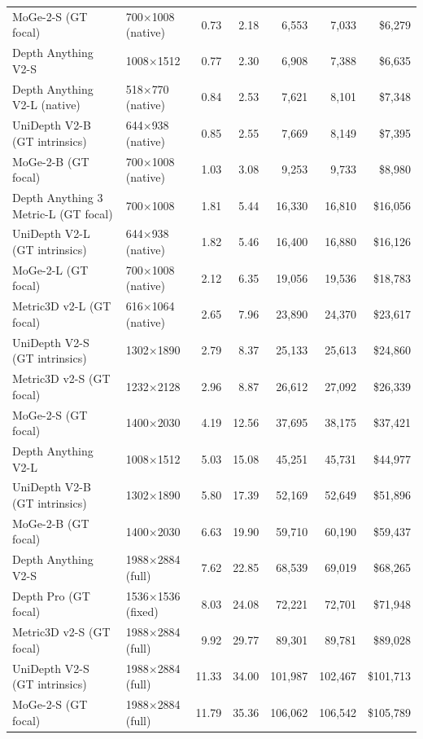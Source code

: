 \begin{tabular}{llrrrrr}
MoGe-2-S (GT focal) & 700$\times$1008 (native) & 0.73 & 2.18 & 6,553 & 7,033 & \$6,279 \\
Depth Anything V2-S & 1008$\times$1512 & 0.77 & 2.30 & 6,908 & 7,388 & \$6,635 \\
Depth Anything V2-L (native) & 518$\times$770 (native) & 0.84 & 2.53 & 7,621 & 8,101 & \$7,348 \\
UniDepth V2-B (GT intrinsics) & 644$\times$938 (native) & 0.85 & 2.55 & 7,669 & 8,149 & \$7,395 \\
MoGe-2-B (GT focal) & 700$\times$1008 (native) & 1.03 & 3.08 & 9,253 & 9,733 & \$8,980 \\
Depth Anything 3 Metric-L (GT focal) & 700$\times$1008 & 1.81 & 5.44 & 16,330 & 16,810 & \$16,056 \\
UniDepth V2-L (GT intrinsics) & 644$\times$938 (native) & 1.82 & 5.46 & 16,400 & 16,880 & \$16,126 \\
MoGe-2-L (GT focal) & 700$\times$1008 (native) & 2.12 & 6.35 & 19,056 & 19,536 & \$18,783 \\
Metric3D v2-L (GT focal) & 616$\times$1064 (native) & 2.65 & 7.96 & 23,890 & 24,370 & \$23,617 \\
UniDepth V2-S (GT intrinsics) & 1302$\times$1890 & 2.79 & 8.37 & 25,133 & 25,613 & \$24,860 \\
Metric3D v2-S (GT focal) & 1232$\times$2128 & 2.96 & 8.87 & 26,612 & 27,092 & \$26,339 \\
MoGe-2-S (GT focal) & 1400$\times$2030 & 4.19 & 12.56 & 37,695 & 38,175 & \$37,421 \\
Depth Anything V2-L & 1008$\times$1512 & 5.03 & 15.08 & 45,251 & 45,731 & \$44,977 \\
UniDepth V2-B (GT intrinsics) & 1302$\times$1890 & 5.80 & 17.39 & 52,169 & 52,649 & \$51,896 \\
MoGe-2-B (GT focal) & 1400$\times$2030 & 6.63 & 19.90 & 59,710 & 60,190 & \$59,437 \\
Depth Anything V2-S & 1988$\times$2884 (full) & 7.62 & 22.85 & 68,539 & 69,019 & \$68,265 \\
Depth Pro (GT focal) & 1536$\times$1536 (fixed) & 8.03 & 24.08 & 72,221 & 72,701 & \$71,948 \\
Metric3D v2-S (GT focal) & 1988$\times$2884 (full) & 9.92 & 29.77 & 89,301 & 89,781 & \$89,028 \\
UniDepth V2-S (GT intrinsics) & 1988$\times$2884 (full) & 11.33 & 34.00 & 101,987 & 102,467 & \$101,713 \\
MoGe-2-S (GT focal) & 1988$\times$2884 (full) & 11.79 & 35.36 & 106,062 & 106,542 & \$105,789 \\

\end{tabular}
